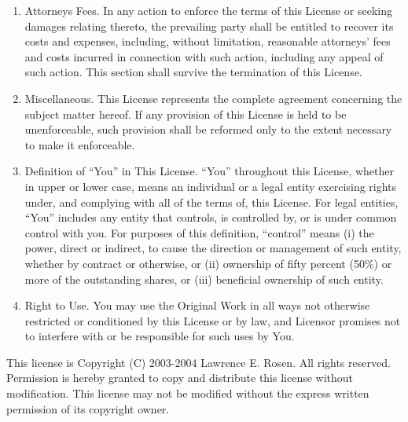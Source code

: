 \documentclass[11pt]{book}
\begin{document}
\begin{enumerate}[1)]
Jurisdiction, Venue and Governing Law. Any action or suit relating to
this License may be brought only in the courts of a jurisdiction
wherein the Licensor resides or in which Licensor conducts its primary
business, and under the laws of that jurisdiction excluding its
conflict-of-law provisions. The application of the United Nations
Convention on Contracts for the International Sale of Goods is
expressly excluded. Any use of the Original Work outside the scope of
this License or after its termination shall be subject to the
requirements and penalties of the U.S. Copyright Act, 17 U.S.C. \^A\S 101
et seq., the equivalent laws of other countries, and international
treaty. This section shall survive the termination of this License.
\item
Attorneys Fees. In any action to enforce the terms of this License or
seeking damages relating thereto, the prevailing party shall be
entitled to recover its costs and expenses, including, without
limitation, reasonable attorneys' fees and costs incurred in
connection with such action, including any appeal of such action. This
section shall survive the termination of this License.
\item
Miscellaneous. This License represents the complete agreement
concerning the subject matter hereof. If any provision of this License
is held to be unenforceable, such provision shall be reformed only to
the extent necessary to make it enforceable.
\item
Definition of ``You'' in This License. ``You'' throughout this License,
whether in upper or lower case, means an individual or a legal entity
exercising rights under, and complying with all of the terms of, this
License. For legal entities, ``You'' includes any entity that controls,
is controlled by, or is under common control with you. For purposes of
this definition, ``control'' means (i) the power, direct or indirect, to
cause the direction or management of such entity, whether by contract
or otherwise, or (ii) ownership of fifty percent (50\%) or more of the
outstanding shares, or (iii) beneficial ownership of such entity.
\item
Right to Use. You may use the Original Work in all ways not otherwise
restricted or conditioned by this License or by law, and Licensor
promises not to interfere with or be responsible for such uses by
You.
\end{enumerate}

This license is Copyright (C) 2003-2004 Lawrence E. Rosen. All rights
reserved. Permission is hereby granted to copy and distribute this
license without modification. This license may not be modified without
the express written permission of its copyright owner.
\end{document}
